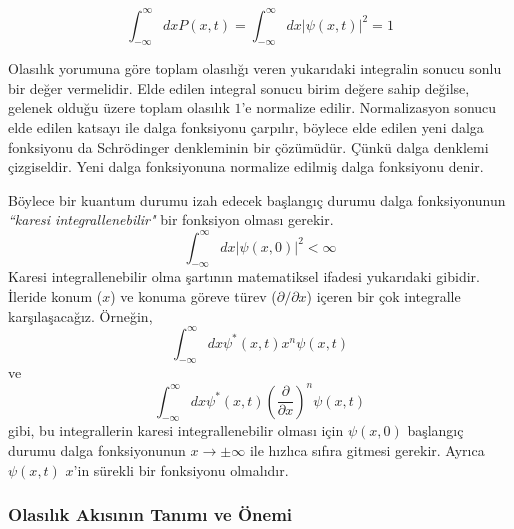 \documentclass[a4paper,12pt, twoside]{article}
\begin{document}
\begin{equation}
\int ^{\infty }_{-\infty }dxP\left( x,t\right) =\int ^{\infty }_{-\infty }dx\left| \psi \left( x,t\right) \right| ^{2}=1
\label{eq:probability_norm}
\end{equation}

Olasılık yorumuna göre toplam olasılığı veren yukarıdaki integralin  sonucu sonlu bir değer vermelidir.  Elde edilen integral sonucu birim değere sahip değilse, gelenek olduğu üzere toplam olasılık $1$'e normalize edilir.  Normalizasyon sonucu  elde edilen katsayı ile dalga fonksiyonu çarpılır, böylece elde edilen yeni dalga fonksiyonu da Schrödinger denkleminin bir çözümüdür. Çünkü dalga denklemi çizgiseldir. Yeni dalga fonksiyonuna normalize edilmiş dalga fonksiyonu denir.

Böylece bir kuantum durumu izah edecek başlangıç durumu dalga fonksiyonunun \emph{``karesi integrallenebilir"} bir fonksiyon olması gerekir. 
\begin{equation}
\int ^{\infty }_{-\infty }dx\left| \psi \left( x,0\right) \right| ^{2} < \infty
\label{eq:square_integrable}
\end{equation}
Karesi integrallenebilir olma şartının matematiksel ifadesi yukarıdaki gibidir. İleride konum ($x$) ve konuma göreve türev ($\partial/\partial x$) içeren bir çok integralle karşılaşacağız. Örneğin,
\begin{equation*}
\int ^{\infty }_{-\infty }dx \psi^* \left( x,t\right) x^n \psi \left( x,t\right) 
\end{equation*}
ve
\begin{equation*}
\int ^{\infty }_{-\infty }dx \psi^* \left( x,t\right) \left(\frac{\partial}{\partial x}\right)^n \psi \left( x,t\right) 
\end{equation*}
gibi, bu integrallerin karesi integrallenebilir olması için $\psi(x,0)$ başlangıç durumu dalga fonksiyonunun $x\rightarrow\pm\infty$ ile hızlıca sıfıra gitmesi gerekir. Ayrıca $\psi(x,t)$ $x$'in sürekli bir fonksiyonu olmalıdır.

\subsubsection{Olasılık Akısının Tanımı ve Önemi}

\end{document}
